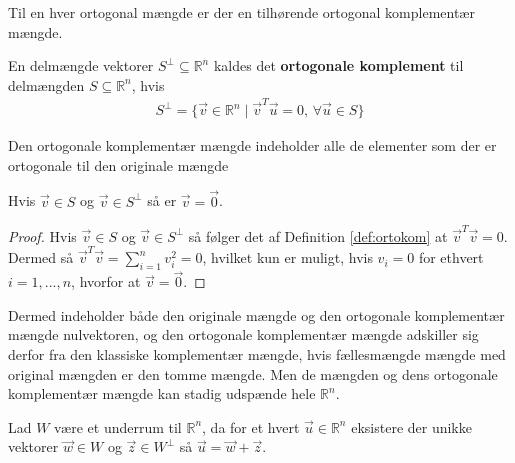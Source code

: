 Til en hver ortogonal mængde er der en tilhørende ortogonal komplementær mængde.
\begin{defn}
En delmængde vektorer $S^{\bot} \subseteq \mathds{R}^n$ kaldes det \textbf{ortogonale komplement} til delmængden $S \subseteq \mathds{R}^n$, hvis 
\begin{align*}
	S^{\bot} = \{\vec{v} \in \mathds{R}^n \mid \vec{v}^T\vec{u} = 0, \, \forall \vec{u} \in S\}
\end{align*}
\label{def:ortokom}
\end{defn}
Den ortogonale komplementær mængde indeholder alle de elementer som der er ortogonale til den originale mængde
\begin{prop}
Hvis $\vec{v} \in S$ og $\vec{v} \in S^{\bot}$ så er  $\vec{v}=\vec{0}$.
\label{prop:nulortokomp}
\end{prop}
\begin{proof}
Hvis $\vec{v} \in S$ og $\vec{v} \in S^{\bot}$ så følger det af Definition \ref{def:ortokom} at $\vec{v}^T\vec{v} = 0$.
Dermed så $\vec{v}^T\vec{v} = \sum_{i=1}^n v_i^2 =0$, hvilket kun er muligt, hvis $v_i = 0$ for ethvert $i = 1,..., n$, hvorfor at $\vec{v}=\vec{0}$.
\end{proof}
Dermed indeholder både den originale mængde og den ortogonale komplementær mængde nulvektoren, og den ortogonale komplementær mængde 
adskiller sig derfor fra den klassiske komplementær mængde, hvis fællesmængde mængde med original mængden er den tomme mængde.
Men de mængden og dens ortogonale komplementær mængde kan stadig udspænde hele $\mathds{R}^n$.
\begin{stn}
Lad $W$ være et underrum til $\mathds{R}^n$, da for et hvert $\vec{u} \in \mathds{R}^n$ eksistere der unikke vektorer $\vec{w} \in W$ og $\vec{z} \in W^{\bot}$ så $\vec{u}= \vec{w}+\vec{z}$.
\label{stn:Rnorto}
\end{stn}
